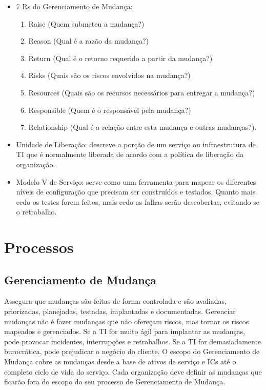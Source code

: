 \begin{itemize}
	\item 7 Rs do Gerenciamento de Mudança:
        \begin{enumerate}
            \item Raise (Quem submeteu a mudança?)
            \item Reason (Qual é a razão da mudança?)
            \item Return (Qual é o retorno requerido a partir da mudança?)
            \item Risks (Quais são os riscos envolvidos na mudança?)
            \item Resources (Quais são os recursos necessários para entregar a
                mudança?)
            \item Responsible (Quem é o responsável pela mudança?)
            \item Relationship (Qual é a relação entre esta mudança e outras
                mudanças?).
        \end{enumerate}

    \item Unidade de Liberação: descreve a porção de um serviço ou
        infraestrutura de TI que é normalmente liberada de acordo com a
        política de liberação da organização.
    \item Modelo V de Serviço: serve como uma ferramenta para mapear os
        diferentes níveis de configuração que precisam ser construídos e
        testados. Quanto mais cedo os testes forem feitos, mais cedo as falhas
        serão descobertas, evitando-se o retrabalho.
\end{itemize}


\section{Processos}
\label{sec:trans:processos}
\subsection{Gerenciamento de Mudança}
Assegura que mudanças são feitas de forma controlada e são avaliadas,
priorizadas, planejadas, testadas, implantadas e documentadas. Gerenciar
mudanças não é fazer mudanças que não ofereçam riscos, mas tornar os riscos
mapeados e gerenciados. Se a TI for muito ágil para implantar as mudanças, pode
provocar incidentes, interrupções e retrabalhos. Se a TI for demasiadamente
burocrática, pode prejudicar o negócio do cliente. O escopo do Gerenciamento de
Mudança cobre as mudanças desde a base de ativos de serviço e ICs até o
completo ciclo de vida do serviço. Cada organização deve definir as mudanças
que ficarão fora do escopo do seu processo de Gerenciamento de Mudança.

